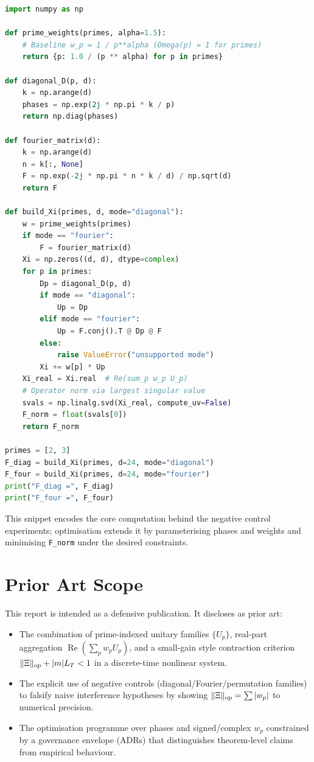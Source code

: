 \documentclass[11pt,letterpaper]{article}
\begin{document}
\begin{lstlisting}[language=Python,basicstyle=\ttfamily\small]
import numpy as np

def prime_weights(primes, alpha=1.5):
    # Baseline w_p = 1 / p**alpha (Omega(p) = 1 for primes)
    return {p: 1.0 / (p ** alpha) for p in primes}

def diagonal_D(p, d):
    k = np.arange(d)
    phases = np.exp(2j * np.pi * k / p)
    return np.diag(phases)

def fourier_matrix(d):
    k = np.arange(d)
    n = k[:, None]
    F = np.exp(-2j * np.pi * n * k / d) / np.sqrt(d)
    return F

def build_Xi(primes, d, mode="diagonal"):
    w = prime_weights(primes)
    if mode == "fourier":
        F = fourier_matrix(d)
    Xi = np.zeros((d, d), dtype=complex)
    for p in primes:
        Dp = diagonal_D(p, d)
        if mode == "diagonal":
            Up = Dp
        elif mode == "fourier":
            Up = F.conj().T @ Dp @ F
        else:
            raise ValueError("unsupported mode")
        Xi += w[p] * Up
    Xi_real = Xi.real  # Re(sum_p w_p U_p)
    # Operator norm via largest singular value
    svals = np.linalg.svd(Xi_real, compute_uv=False)
    F_norm = float(svals[0])
    return F_norm

primes = [2, 3]
F_diag = build_Xi(primes, d=24, mode="diagonal")
F_four = build_Xi(primes, d=24, mode="fourier")
print("F_diag =", F_diag)
print("F_four =", F_four)
\end{lstlisting}

This snippet encodes the core computation behind the negative control
experiments; optimisation extends it by parameterising phases and weights
and minimising \texttt{F\_norm} under the desired constraints.

\section{Prior Art Scope}

This report is intended as a defensive publication.
It discloses as prior art:

\begin{itemize}[leftmargin=*]
  \item The combination of prime-indexed unitary families \(\{U_p\}\),
        real-part aggregation \(\operatorname{Re}(\sum_p w_p U_p)\), and
        a small-gain style contraction criterion \(\|\Xi\|_{\rm op} + |m|L_T < 1\)
        in a discrete-time nonlinear system.
  \item The explicit use of negative controls (diagonal/Fourier/permutation
        families) to falsify naive interference hypotheses by showing
        \(\|\Xi\|_{\rm op} = \sum |w_p|\) to numerical precision.
  \item The optimisation programme over phases and signed/complex \(w_p\)
        constrained by a governance envelope (ADRs) that distinguishes
        theorem-level claims from empirical behaviour.
\end{itemize}
\end{document}
